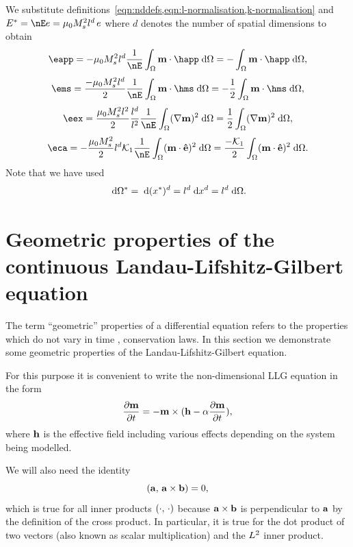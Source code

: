 We substitute definitions~\cref{eqn:nddefs,eqn:l-normalisation,k-normalisation} and $E^* = \nE e = \mu_0 M_s^2 l^d \, e$ where $d$ denotes the number of spatial dimensions to obtain
\begin{equation}
  \eapp = -\mu_0 M_s^2 l^d \frac{1}{\nE} \int_{\magd} \mv \cdot \happ \d \magd
  = - \int_{\magd} \mv \cdot \happ \d \magd,
  \label{eq:nd-e-app}
\end{equation}
\begin{equation}
  \ems = \frac{-\mu_0 M_s^2 l^d}{2} \frac{1}{\nE} \int_{\magd} \mv \cdot \hms \d \magd
  = -\frac{1}{2} \int_{\magd} \mv \cdot \hms \d \magd,
  \label{eq:nd-e-ms}
\end{equation}
\begin{equation}
  \eex =  \frac{\mu_0 M_s^2 l^2}{2} \frac{l^d}{l^2} \frac{1}{\nE} \int_{\magd} (\nabla \mv)^2 \d \magd
  = \frac{1}{2} \int_{\magd} (\nabla \mv)^2 \d \magd,
  \label{eq:nd-e-ex}
\end{equation}
\begin{equation}
  \eca = - \frac{\mu_0 M_s^2}{2 } l^d \kone \frac{1}{\nE} \int_\magd (\mv \cdot \ev)^2 \d \magd
  = \frac{-\kone}{2} \int_\magd (\mv \cdot \ev)^2 \d \magd.
  \label{eq:nd-e-ca}
\end{equation}
Note that we have used
\begin{equation}
  {\; \text{d}} \Omega^* = {\; \text{d}} (x^*)^d = l^d {\; \text{d}} x^d = l^d {\; \text{d}} \Omega.
\end{equation}


\section{Geometric properties of the continuous Landau-Lifshitz-Gilbert equation}
\label{sec:prop-cont-llg}

The term ``geometric'' properties of a differential equation refers to the properties which do not vary in time \cite[73]{Iserles2009}, \ie conservation laws.
In this section we demonstrate some geometric properties of the Landau-Lifshitz-Gilbert equation.

For this purpose it is convenient to write the non-dimensional LLG equation in the form
\begin{equation}
  \label{eq:llg-prop-form}
  \frac{\partial \mathbf{m}}{\partial t} = - \mathbf{m} \times( \mathbf{h} - \alpha \frac{\partial \mathbf{m}}{\partial t}),
\end{equation}
where $\mathbf{h}$ is the effective field including various effects depending on the system being modelled.

We will also need the identity
\begin{equation}
  \label{eq:dot-cross-id}
  \left({\mathbf{a}},\, {\mathbf{a}} \times {\mathbf{b}} \right) = 0,
\end{equation}
which is true for all inner products $\left(\cdot,\, \cdot \right)$ because ${\mathbf{a}} \times {\mathbf{b}}$ is perpendicular to ${\mathbf{a}}$ by the definition of the cross product.
In particular, it is true for the dot product of two vectors (also known as scalar multiplication) and the $L^2$ inner product.

